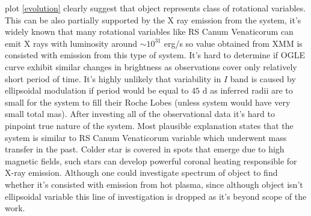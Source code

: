\documentclass{pracalicmgr}
\begin{document}
plot \ref{evolution} clearly suggest that object represents class of rotational variables. This can be also partially supported by the X ray emission from the system, 
it's widely known that many rotational variables like RS Canum Venaticorum can emit X rays with luminosity around $\sim 10^{31}$ erg/s  \citep{walter_x-rays_1980} so value obtained from XMM 
is consisted with emission from this type of system. It's hard to determine if OGLE curve exhibit similar changes in brightness as observations cover only relatively short period of time.
It's highly unlikely that variability in $I$ band is caused by ellipsoidal modulation if period would be equal to $45$ d as inferred radii are to small for the system to fill their Roche Lobes 
(unless system would have very small total mas). After investing all of the observational data it's hard to pinpoint true nature of the system. Most plausible 
explanation states that the system is similar to RS Canum Venaticorum variable which underwent mass transfer in the past. Colder star is covered in spots 
that emerge due to high magnetic fields, such stars can develop powerful coronal heating responsible for X-ray emission. Although one could investigate spectrum 
of object to find whether it's consisted with emission from hot plasma, since although object isn't ellipsoidal variable this line of investigation is dropped as it's beyond
scope of the work.%
\end{document}
